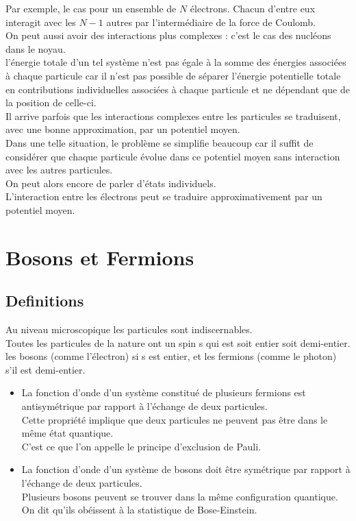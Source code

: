 \documentclass[12pt,oneside]{book}
\begin{document}
Par exemple, le cas pour un ensemble de $N$ électrons. Chacun d'entre eux interagit avec les $N - 1$ autres par l'intermédiaire de la force de Coulomb.\\

On peut aussi avoir des interactions plus complexes : c'est le cas des nucléons dans le noyau.\\
l'énergie totale d'un tel système n'est pas égale à la somme des énergies associées à chaque particule car il n'est pas possible de séparer l'énergie potentielle totale en contributions individuelles associées à chaque particule et ne dépendant que de la position de celle-ci.\\

Il arrive parfois que les interactions complexes entre les particules se traduisent, avec une bonne approximation, par un potentiel moyen.\\
Dans une telle situation, le problème se simplifie beaucoup car il suffit de considérer que chaque particule évolue dans ce potentiel moyen sans interaction avec les autres particules.\\
On peut alors encore de parler d'états individuels.\\
L'interaction entre les électrons peut se traduire approximativement par un potentiel moyen.
\section{Bosons et Fermions}
\subsection{Definitions}
Au niveau microscopique les particules sont indiscernables.\\
Toutes les particules de la nature ont un spin s qui est soit entier soit demi-entier.\\
les bosons (comme l'électron) si s est entier, et les fermions (comme le photon) s'il est demi-entier.\\
\begin{itemize}
	\item La fonction d'onde d'un système constitué de plusieurs fermions est antisymétrique par rapport à l'échange de deux particules.\\
	      Cette propriété implique que deux particules ne peuvent pas être dans le même état quantique.\\
	      C'est ce que l'on appelle le principe d'exclusion de Pauli.
	\item La fonction d'onde d'un système de bosons doit être symétrique par rapport à l'échange de deux particules.\\
	      Plusieurs bosons peuvent se trouver dans la même configuration quantique.\\
	      On dit qu'ils obéissent à la statistique de Bose-Einstein.
\end{itemize}
\end{document}
